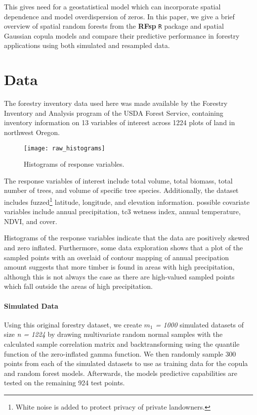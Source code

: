 \documentclass{article}
\begin{document}
This gives need for a geostatistical model which can incorporate spatial dependence and model overdispersion of zeros.
In this paper, we give a brief overview of spatial random forests from the \textbf{RFsp} \texttt{R} package\cite{hengl18} and spatial Gaussian copula models\cite{madsen09} and compare their predictive performance in forestry applications using both simulated and resampled data.

\section{Data}

The forestry inventory data used here was made available by the Forestry Inventory and Analysis program of the USDA Forest Service, containing inventory information on 13 variables of interest across 1224 plots of land in northwest Oregon.

\begin{wrapfigure}{r}{.4\textwidth}
	\texttt{[image: raw\_histograms]}
	\caption{Histograms of response variables.}
\end{wrapfigure}

The response variables of interest include total volume, total biomass, total number of trees, and volume of specific tree species.
Additionally, the dataset includes fuzzed\footnote{White noise is added to protect privacy of private landowners.} latitude, longitude, and elevation information.
possible covariate variables include annual precipitation, tc3 wetness index\cite{raynolds16}, annual temperature, NDVI, and cover.

Histograms of the response variables indicate that the data are positively skewed and zero inflated.
Furthermore, some data exploration shows that a plot of the sampled points with an overlaid of contour mapping of annual precipation amount suggests that more timber is found in areas with high precipitation, although this is not always the case as there are high-valued sampled points which fall outside the areas of high precipitation.

\paragraph{Simulated Data} Using this original forestry dataset, we create \textit{$m_1$ = 1000} simulated datasets of size \textit{n = 1224} by drawing multivariate random normal samples with the calculated sample correlation matrix and backtransforming using the quantile function of the zero-inflated gamma function.
We then randomly sample 300 points from each of the simulated datasets to use as training data for the copula and random forest models.
Afterwards, the models predictive capabilities are tested on the remaining 924 test points.
\end{document}
